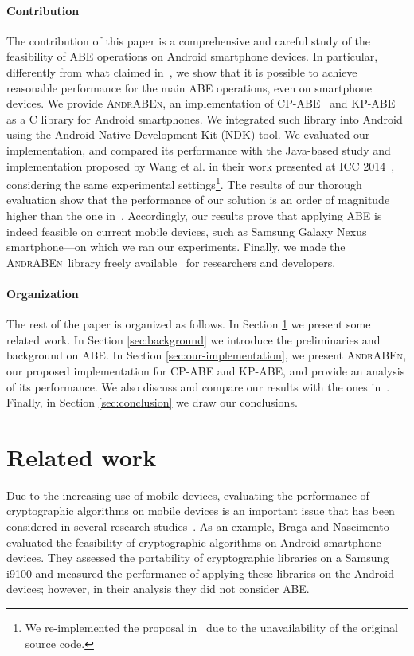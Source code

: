 \documentclass{sig-alternate-2013}
\newcommand{\andraben}{\textsc{AndrABEn}}
\begin{document}
\newpage
\paragraph{Contribution} The contribution of this paper is a comprehensive and careful study of the feasibility of ABE operations on Android smartphone devices.
In particular, differently from what claimed in~\cite{ABE_icc_2014}, we show that it is possible to achieve reasonable performance for the main ABE operations, even on smartphone devices. 
We provide \andraben, an implementation of CP-ABE~\cite{bethencourt2007ciphertext} and KP-ABE~\cite{goyal2006attribute} as a C library for Android smartphones. We integrated such library into Android using the Android Native Development Kit (NDK) tool. We evaluated our implementation, and compared its performance with the Java-based study and implementation proposed by Wang et al. in their work presented at ICC 2014~\cite{ABE_icc_2014}, considering the same experimental settings\footnote{We re-implemented the proposal in~\cite{ABE_icc_2014} due to the unavailability of the original source code.}.
The results of our thorough evaluation show that the performance of our solution is an order of magnitude higher than the one in~\cite{ABE_icc_2014}. Accordingly, our results prove that applying ABE is indeed feasible on current mobile devices, such as Samsung Galaxy Nexus smartphone---on which we ran our experiments. Finally, we made the \andraben~library freely available~\cite{andraben_impl} for researchers and developers.


\paragraph{Organization} The rest of the paper is organized as follows. In Section \ref{sec:related} we present some related work. In Section \ref{sec:background} we introduce the preliminaries and background on ABE. In Section \ref{sec:our-implementation}, we present \andraben, our proposed implementation for CP-ABE and KP-ABE, and provide an analysis of its performance. We also discuss and compare our results with the ones in~\cite{ABE_icc_2014}. Finally, in Section \ref{sec:conclusion} we draw our conclusions.   


\section{Related work}\label{sec:related}
Due to the increasing use of mobile devices, evaluating the performance of cryptographic algorithms on mobile devices is an important issue that has been considered in several research studies~\cite{tillich2004survey, kawahara2006efficient, voyiatzis2011increasing, braga2012portability}. 
As an example, Braga and Nascimento~\cite{braga2012portability} evaluated the feasibility of cryptographic algorithms on Android smartphone devices. They assessed the portability of cryptographic libraries on a Samsung i9100 and measured the performance of applying these libraries on the Android devices; however, in their analysis they did not consider ABE. 
\end{document}
